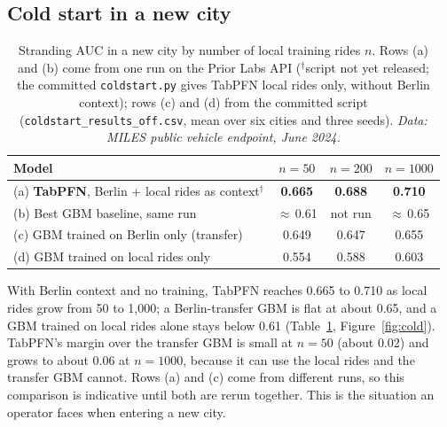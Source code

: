 \documentclass[11pt,a4paper]{article}
\begin{document}
\subsection{Cold start in a new city}

\begin{table}[h]
\centering
\caption{Stranding AUC in a new city by number of local training rides $n$. Rows (a) and (b) come from one run on the Prior Labs API ($^\dagger$script not yet released; the committed \texttt{coldstart.py} gives TabPFN local rides only, without Berlin context); rows (c) and (d) from the committed script (\texttt{coldstart\_results\_off.csv}, mean over six cities and three seeds). \emph{Data: MILES public vehicle endpoint, June 2024.}}
\label{tab:cold}
\begin{tabular}{lccc}
\toprule
Model & $n=50$ & $n=200$ & $n=1000$ \\
\midrule
(a) \textbf{TabPFN}, Berlin + local rides as context$^\dagger$ & \textbf{0.665} & \textbf{0.688} & \textbf{0.710} \\
(b) Best GBM baseline, same run & $\approx$\,0.61 & not run & $\approx$\,0.65 \\
(c) GBM trained on Berlin only (transfer) & 0.649 & 0.647 & 0.655 \\
(d) GBM trained on local rides only & 0.554 & 0.588 & 0.603 \\
\bottomrule
\end{tabular}
\end{table}

With Berlin context and no training, TabPFN reaches 0.665 to 0.710 as local rides grow from 50 to 1,000; a Berlin-transfer GBM is flat at about 0.65, and a GBM trained on local rides alone stays below 0.61 (Table~\ref{tab:cold}, Figure~\ref{fig:cold}). TabPFN's margin over the transfer GBM is small at $n=50$ (about 0.02) and grows to about 0.06 at $n=1000$, because it can use the local rides and the transfer GBM cannot. Rows (a) and (c) come from different runs, so this comparison is indicative until both are rerun together. This is the situation an operator faces when entering a new city.
\end{document}
